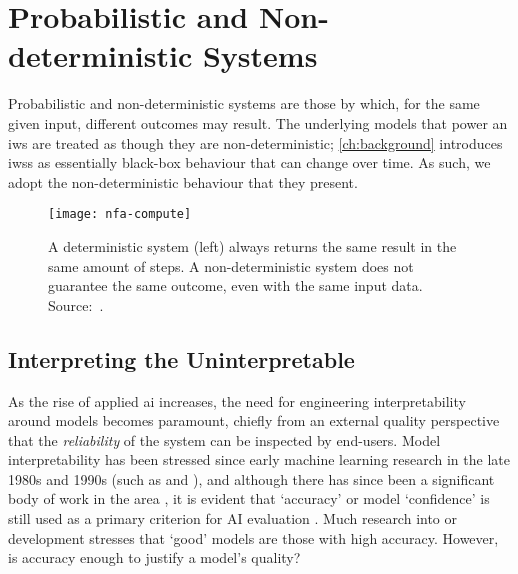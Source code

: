 \section{Probabilistic and Non-deterministic Systems}
\label{sec:background:probabilistic-stochastic}

Probabilistic and non-deterministic systems are those by which, for the same given input, different outcomes may result. The underlying models that power an \gls{iws} are treated as though they are non-deterministic; \cref{ch:background} introduces \glspl{iws} as essentially black-box behaviour that can change over time. As such, we adopt the non-deterministic behaviour that they present.

\begin{figure}[h!]
  \centering
  \texttt{[image: nfa-compute]}
  \caption[Deterministic versus non-deterministic systems]{A deterministic system (left) always returns the same result in the same amount of steps. A non-deterministic system does not guarantee the same outcome, even with the same input data. Source:~\citep{Finalyson:2018aa}.}
  \label{fig:background:probabilistic-stochastic:nfa-compute}
\end{figure}

\subsection{Interpreting the Uninterpretable}
\label{ssec:background:probabilistic-stochastic:model-interpretability}

As the rise of applied \gls{ai} increases, the need for engineering interpretability around models becomes paramount, chiefly from an external quality perspective that the \textit{reliability} of the system can be inspected by end-users. Model interpretability has been stressed since early machine learning research in the late 1980s and 1990s (such as \citet{Quinlan:1999ue} and \citet{Michie:1988te}), and although there has since been a significant body of work in the area \citep{Singh:2016wu,Baehrens:2010tj,Ribeiro:2016gg,Bussone:2015wm,Ross:2017vn,Lipton:2016if,Boz:2002uv,Johansson:2009uo,Augasta:2012wx,Fung:2005we,Dejaeger:2012up,VanAssche:2007wc,BenDavid:1995up,Feelders:2000ve,Lima:2009tm,Martens:2011uh,Pazzani:1997vp,Verbeke:2011vo}, it is evident that `accuracy' or model `confidence' is still used as a primary criterion for AI evaluation \citep{Huang:2005tc,Japkowicz:2011vy,Sokolova:2009vu}. Much research into  or  development stresses that `good' models are those with high accuracy. However, is accuracy enough to justify a model's quality?

